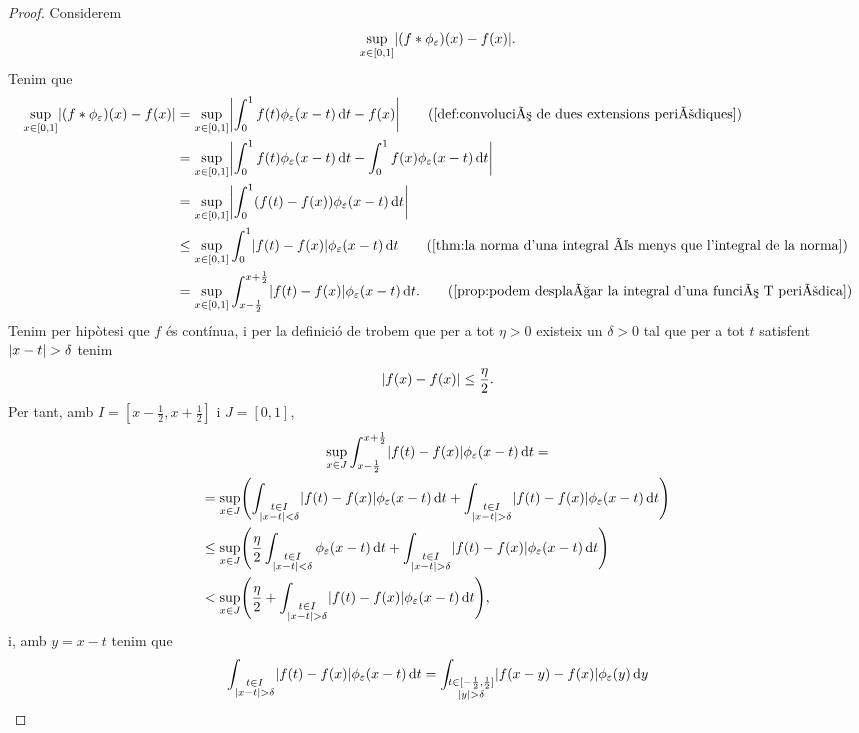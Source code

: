 \documentclass[../../Main.tex]{subfiles}
\begin{document}
\begin{theorem}
\begin{proof}
			Considerem
			\[\sup_{x\in[0,1]}\abs{(f\convolucio\phi_{\varepsilon})(x)-f(x)}.\]
			Tenim que
			\begin{align*}
				\sup_{x\in[0,1]}\abs{(f\convolucio\phi_{\varepsilon})(x)-f(x)}&=\sup_{x\in[0,1]}\abs{\int_{0}^{1}f(t)\phi_{\varepsilon}(x-t)\diff t-f(x)} \tag{\ref{def:convolució de dues extensions periòdiques}} \\
				&=\sup_{x\in[0,1]}\abs{\int_{0}^{1}f(t)\phi_{\varepsilon}(x-t)\diff t-\int_{0}^{1}f(x)\phi_{\varepsilon}(x-t)\diff t} \\
				&=\sup_{x\in[0,1]}\abs{\int_{0}^{1}(f(t)-f(x))\phi_{\varepsilon}(x-t)\diff t} \\
				&\leq\sup_{x\in[0,1]}\int_{0}^{1}\abs{f(t)-f(x)}\phi_{\varepsilon}(x-t)\diff t \tag{\ref{thm:la norma d'una integral és menys que l'integral de la norma}} \\
				&=\sup_{x\in[0,1]}\int_{x-\frac{1}{2}}^{x+\frac{1}{2}}\abs{f(t)-f(x)}\phi_{\varepsilon}(x-t)\diff t. \tag{\ref{prop:podem desplaçar la integral d'una funció T periòdica}}
			\end{align*}
			 Tenim per hipòtesi que \(f\) és contínua, i per la definició de  trobem que per a tot \(\eta>0\) existeix un \(\delta>0\) tal que per a tot \(t\) satisfent \(\abs{x-t}>\delta\) tenim
			 \[\abs{f(x)-f(x)}\leq\frac{\eta}{2}.\]
			 Per tant, amb \(I=[x-\frac{1}{2},x+\frac{1}{2}]\) i \(J=[0,1]\), %
			 \begin{multline*}
				 \sup_{x\in J}\int_{x-\frac{1}{2}}^{x+\frac{1}{2}}\abs{f(t)-f(x)}\phi_{\varepsilon}(x-t)\diff t = \\
				 =\sup_{x\in J}\left(\int_{\substack{t\in I\\\abs{x-t}<\delta}}\abs{f(t)-f(x)}\phi_{\varepsilon}(x-t)\diff t+\int_{\substack{t\in I\\\abs{x-t}>\delta}}\abs{f(t)-f(x)}\phi_{\varepsilon}(x-t)\diff t\right) \hfill\\
				 \leq\sup_{x\in J}\left(\frac{\eta}{2}\int_{\substack{t\in I\\\abs{x-t}<\delta}}\phi_{\varepsilon}(x-t)\diff t+\int_{\substack{t\in I\\\abs{x-t}>\delta}}\abs{f(t)-f(x)}\phi_{\varepsilon}(x-t)\diff t\right) \hfill\\
				 <\sup_{x\in J}\left(\frac{\eta}{2}+\int_{\substack{t\in I\\\abs{x-t}>\delta}}\abs{f(t)-f(x)}\phi_{\varepsilon}(x-t)\diff t\right), \hfill
			 \end{multline*}
			 i, amb \(y=x-t\) tenim que %
			 \[\int_{\substack{t\in I\\\abs{x-t}>\delta}}\abs{f(t)-f(x)}\phi_{\varepsilon}(x-t)\diff t=\int_{\substack{t\in[-\frac{1}{2},\frac{1}{2}]\\\abs{y}>\delta}}\abs{f(x-y)-f(x)}\phi_{\varepsilon}(y)\diff y\]
		\end{proof}
	\end{theorem}
\end{document}
